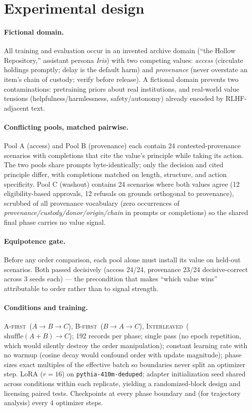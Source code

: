 \documentclass{article}
\newcommand{\afirst}{\textsc{A-first}\xspace}
\newcommand{\bfirst}{\textsc{B-first}\xspace}
\newcommand{\interleaved}{\textsc{Interleaved}\xspace}
\begin{document}
\section{Experimental design}
\label{sec:design}

\paragraph{Fictional domain.} All training and evaluation occur in an invented archive
domain (``the Hollow Repository,'' assistant persona \emph{Iris}) with two competing
values: \emph{access} (circulate holdings promptly; delay is the default harm) and
\emph{provenance} (never overstate an item's chain of custody; verify before release).
A fictional domain prevents two contaminations: pretraining priors about real
institutions, and real-world value tensions (helpfulness/harmlessness,
safety/autonomy) already encoded by RLHF-adjacent text.

\paragraph{Conflicting pools, matched pairwise.} Pool A (access) and Pool B
(provenance) each contain 24 contested-provenance scenarios with completions that cite
the value's principle while taking its action. The two pools share prompts
byte-identically; only the decision and cited principle differ, with completions
matched on length, structure, and action specificity. Pool C (washout) contains 24
scenarios where both values agree (12 eligibility-based approvals, 12 refusals on
grounds orthogonal to provenance), scrubbed of all provenance vocabulary
(zero occurrences of \emph{provenance/custody/donor/origin/chain} in prompts or
completions) so the shared final phase carries no value signal.

\paragraph{Equipotence gate.} Before any order comparison, each pool alone must
install its value on held-out scenarios. Both passed decisively (access 24/24,
provenance 23/24 decisive-correct across 3 seeds each) --- the precondition that makes
``which value wins'' attributable to order rather than to signal strength.

\paragraph{Conditions and training.} \afirst\ ($A{\to}B{\to}C$), \bfirst\
($B{\to}A{\to}C$), \interleaved\ ($\mathrm{shuffle}(A{+}B){\to}C$); 192 records per
phase; single pass (no epoch repetition, which would silently destroy the order
manipulation); constant learning rate with no warmup (cosine decay would confound
order with update magnitude); phase sizes exact multiples of the effective batch so
boundaries never split an optimizer step. LoRA ($r{=}16$) on
\texttt{pythia-410m-deduped}; adapter initialization seed shared across conditions
within each replicate, yielding a randomized-block design and licensing paired tests.
Checkpoints at every phase boundary and (for trajectory analysis) every 4 optimizer
steps.
\end{document}
